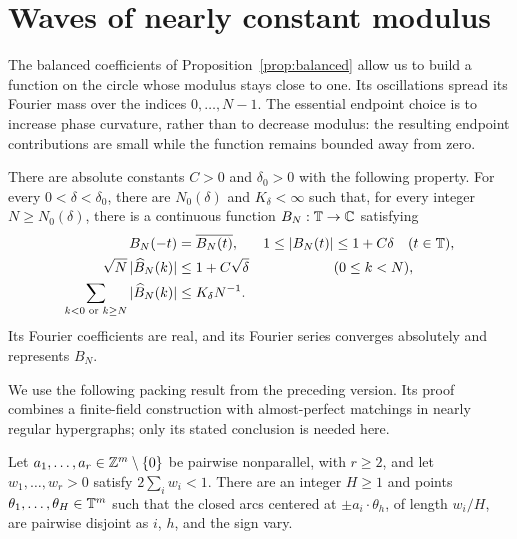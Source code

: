 \section{Waves of nearly constant modulus}\label{sec:waves}

The balanced coefficients of Proposition~\ref{prop:balanced} allow us to
build a function on the circle whose modulus stays close to one.  Its
oscillations spread its Fourier mass over the indices $0,\ldots,N-1$.
The essential endpoint choice is to increase phase curvature, rather than
to decrease modulus: the resulting endpoint contributions are small while
the function remains bounded away from zero.

\begin{proposition}\label{prop:waves}
There are absolute constants $C>0$ and $\delta_0>0$ with the following
property.  For every $0<\delta<\delta_0$, there are $N_0(\delta)$ and
$K_\delta<\infty$ such that, for every integer $N\ge N_0(\delta)$, there is
a continuous function $B_N:\mathbb T\to\mathbb C$ satisfying
\begin{align}
 B_N(-t)&=\overline{B_N(t)}, &
 1\le |B_N(t)|&\le 1+C\delta \quad(t\in\mathbb T),
 \label{eq:wave-modulus}\\
 \sqrt N\,|\widehat B_N(k)|&\le 1+C\sqrt\delta
 &&(0\le k<N),\label{eq:wave-coefficients}\\
 \sum_{k<0\text{ or }k\ge N}|\widehat B_N(k)|
 &\le K_\delta N^{-1}.\label{eq:wave-tail}
\end{align}
Its Fourier coefficients are real, and its Fourier series converges
absolutely and represents $B_N$.
\end{proposition}

We use the following packing result from the preceding version.  Its
proof combines a finite-field construction with almost-perfect matchings
in nearly regular hypergraphs; only its stated conclusion is needed here.

\begin{lemma}
\label{lem:signed-packing}
Let $a_1,\ldots,a_r\in\mathbb Z^m\setminus\{0\}$ be pairwise nonparallel, with
$r\ge2$, and let $w_1,\ldots,w_r>0$ satisfy $2\sum_iw_i<1$.
There are an integer $H\ge1$ and points $\theta_1,\ldots,\theta_H\in\mathbb T^m$
such that the closed arcs centered at $\pm a_i\cdot\theta_h$, of length
$w_i/H$, are pairwise disjoint as $i$, $h$, and the sign vary.
\end{lemma}

